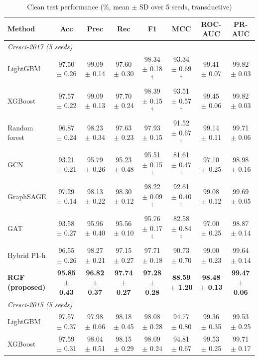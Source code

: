 \begin{table}[!t]
\centering
\caption{Clean test performance (\%, mean $\pm$ SD over 5 seeds, transductive)}
\label{tab:clean_performance}
\footnotesize
\setlength{\tabcolsep}{3pt}
\begin{tabular}{lccccccc}
\hline
\textbf{Method} & \textbf{Acc} & \textbf{Prec} & \textbf{Rec} & \textbf{F1} & \textbf{MCC} & \textbf{ROC-AUC} & \textbf{PR-AUC} \\
\hline
\multicolumn{8}{l}{\textit{Cresci-2017 (5 seeds)}} \\
LightGBM & 97.50 $\pm$ 0.26 & 99.09 $\pm$ 0.14 & 97.60 $\pm$ 0.30 & 98.34 $\pm$ 0.18$^\dagger$ & 93.34 $\pm$ 0.69$^\dagger$ & 99.41 $\pm$ 0.07 & 99.82 $\pm$ 0.03 \\
XGBoost & 97.57 $\pm$ 0.22 & 99.09 $\pm$ 0.13 & 97.70 $\pm$ 0.24 & 98.39 $\pm$ 0.15$^\dagger$ & 93.51 $\pm$ 0.57$^\dagger$ & 99.45 $\pm$ 0.06 & 99.82 $\pm$ 0.03 \\
Random forest & 96.87 $\pm$ 0.24 & 98.23 $\pm$ 0.34 & 97.63 $\pm$ 0.23 & 97.93 $\pm$ 0.15 & 91.52 $\pm$ 0.67$^\dagger$ & 99.14 $\pm$ 0.11 & 99.71 $\pm$ 0.06 \\
GCN & 93.21 $\pm$ 0.21 & 95.79 $\pm$ 0.26 & 95.23 $\pm$ 0.48 & 95.51 $\pm$ 0.15$^\ddagger$ & 81.61 $\pm$ 0.47$^\ddagger$ & 97.10 $\pm$ 0.25 & 98.98 $\pm$ 0.16 \\
GraphSAGE & 97.29 $\pm$ 0.14 & 98.13 $\pm$ 0.22 & 98.30 $\pm$ 0.12 & 98.22 $\pm$ 0.09$^\dagger$ & 92.61 $\pm$ 0.40$^\dagger$ & 99.08 $\pm$ 0.12 & 99.69 $\pm$ 0.05 \\
GAT & 93.58 $\pm$ 0.27 & 95.96 $\pm$ 0.40 & 95.56 $\pm$ 0.10 & 95.76 $\pm$ 0.17$^\ddagger$ & 82.58 $\pm$ 0.84$^\ddagger$ & 97.00 $\pm$ 0.25 & 98.87 $\pm$ 0.14 \\
Hybrid P1-h & 96.55 $\pm$ 0.26 & 98.27 $\pm$ 0.21 & 97.15 $\pm$ 0.27 & 97.71 $\pm$ 0.18 & 90.73 $\pm$ 0.70 & 99.00 $\pm$ 0.23 & 99.64 $\pm$ 0.14 \\
\textbf{RGF (proposed)} & \textbf{95.85 $\pm$ 0.43} & \textbf{96.82 $\pm$ 0.37} & \textbf{97.74 $\pm$ 0.27} & \textbf{97.28 $\pm$ 0.28} & \textbf{88.59 $\pm$ 1.20} & \textbf{98.48 $\pm$ 0.13} & \textbf{99.47 $\pm$ 0.06} \\
\multicolumn{8}{l}{\textit{Cresci-2015 (5 seeds)}} \\
LightGBM & 97.57 $\pm$ 0.37 & 97.98 $\pm$ 0.66 & 98.18 $\pm$ 0.45 & 98.08 $\pm$ 0.28 & 94.77 $\pm$ 0.80 & 99.36 $\pm$ 0.35 & 99.53 $\pm$ 0.25 \\
XGBoost & 97.59 $\pm$ 0.31 & 98.04 $\pm$ 0.51 & 98.15 $\pm$ 0.29 & 98.09 $\pm$ 0.24 & 94.81 $\pm$ 0.67 & 99.53 $\pm$ 0.25 & 99.71 $\pm$ 0.17 \\

\end{tabular}
\end{table}

